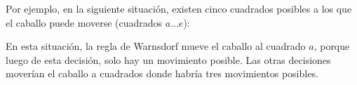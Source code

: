 Por ejemplo, en la siguiente situación, existen cinco cuadrados posibles
a los que el caballo puede moverse (cuadrados $a \ldots e$):
\begin{center}
\end{center}
En esta situación, la regla de Warnsdorf mueve el caballo al cuadrado $a$,
porque luego de esta decisión, solo hay un movimiento posible. Las otras
decisiones moverían el caballo a cuadrados donde habría tres movimientos
posibles.
